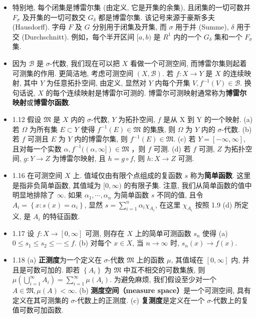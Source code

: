 \begin{itemize}
\item 特别地, 每个闭集是博雷尔集 (由定义, 它是开集的余集), 且闭集的一切可数并 $F_{\sigma}$ 及开集的一切可数交 $G_{\delta}$ 都是博雷尔集. 该记号来源于豪斯多夫 (Hausdorff). 字母 $F$ 及 $G$ 分别用于闭集及开集, 而 $\sigma$ 用于并 (Summe), $\delta$ 用于交 (Durchschnitt). 例如，每个半开区间 $[a, b)$ 是 $R^{1}$ 内的一个 $G_{\delta}$ 集和一个 $F_{\sigma}$ 集.

\item 因为 $\mathscr{B}$ 是 $\sigma$-代数, 我们现在可以把 $X$ 看做一个可测空间, 而博雷尔集则起着可测集的作用. 更简洁地, 考虑可测空间 $(X, \mathscr{B})$. 若 $f: X \rightarrow Y$ 是 $X$ 的连续映射, 其中 $Y$ 为任意拓扑空间, 由定义, 显然对 $Y$ 内每个开集 $V, f^{-1}(V) \in \mathscr{B}$. 换句话说, $X$ 的每个连续映射是博雷尔可测的. 博雷尔可测映射通常称为\textbf{博雷尔映射}或\textbf{博雷尔函数}.

\item 1.12 假设 $\mathfrak{M}$ 是 $X$ 内的 $\sigma$-代数, $Y$ 为拓扑空间, $f$ 是从 $\mathrm{X}$ 到 $\mathrm{Y}$ 的一个映射.
(a) 若 $\Omega$ 为所有集 $E \subset Y$ 使得 $f^{-1}(E) \in \mathfrak{M}$ 的集族, 则 $\Omega$ 为 $Y$ 内的 $\sigma$-代数.
(b) 若 $f$ 可测且 $E$ 为 $Y$ 内的博雷尔集, 则 $f^{-1}(E) \in \mathfrak{M}$.
(c) 若 $Y=[-\infty, \infty]$, 且对每一个实数 $\alpha, f^{-1}((\alpha, \infty]) \in \mathfrak{M}$ ，则 $f$ 可测.
(d) 若 $f$ 可测, $Z$ 为拓扑空间, $g: Y \rightarrow Z$ 为博雷尔映射, 且 $h=g \circ f$, 则 $h: X \rightarrow Z$ 可测.

\item 1.16 在可测空间 $X$ 上. 值域仅由有限个点组成的复函数 $s$ 称为\textbf{简单函数}. 这里是指非负简单函数, 其值域为 $[0, \infty)$ 的有限子集. 注意, 我们从简单函数的值中明显地排除了 $\infty$. 如果 $\alpha_{1}, \cdots, \alpha_{n}$ 为简单函数 $s$ 不同的值, 且令 $A_{i}=\left\{x: s(x)=\alpha_{i}\right\}$, 显然 $s=\sum_{i=1}^{n} \alpha_{i} \chi_{A_{i}}$, 在这里 $\chi_{A_{i}}$ 按照 1.9 (d) 所定义, 是 $A_{i}$ 的特征函数.

\item 1.17 设 $f:X \rightarrow[0, \infty]$ 可测, 则存在 $X$ 上的简单可测函数 $s_{n}$ 使得 (a) $0 \leqslant s_{1} \leqslant s_{2} \leqslant \cdots \leqslant f$. (b) 对每个 $x \in X$, 当 $n \rightarrow \infty$ 时, $s_{n}(x) \rightarrow f(x)$.

\item 1.18 (a) \textbf{正测度}为一个定义在 $\sigma$-代数 $\mathfrak{M}$ 上的函数 $\mu$, 其值域在 $[0, \infty]$ 内, 并且是可数可加的. 即若 $\left\{A_{i}\right\}$ 为 $\mathfrak{M}$ 中互不相交的可数集族, 则 $\mu\left(\bigcup_{i=1}^{\infty} A_{i}\right)=\sum_{i=1}^{\infty} \mu\left(A_{i}\right)$. 为避免麻烦, 我们假设至少对一个 $A \in \mathfrak{M}, \mu(A)<\infty$.
(b) \textbf{测度空间（measure space）}是一个可测空间, 具有定义在其可测集的 $\sigma$-代数上的正测度.
(c) \textbf{复测度}是定义在一个 $\sigma$-代数上的复值可数可加函数.


\end{itemize}
